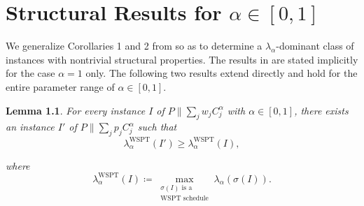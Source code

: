 \documentclass[%
english, titlepage=false %
]{./tum-templates/book/tumbook}
\newtheorem{lemma}{Lemma}
\newcommand{\Problem}{P\!\parallel\!\sum_j p_j C^{\alpha}_j}
\begin{document}
\chapter{Structural Results for
\texorpdfstring{$\alpha \in [0,1]$}{alpha in [0,1]}}\label{chap:alpha_all}

We generalize Corollaries 1 and 2 from \cite{Schwiegelshohn:2011} so as to determine a $\lambda_{\alpha}$-dominant class of instances
with nontrivial structural properties. The results in \cite{Schwiegelshohn:2011} are stated implicitly for 
the case $\alpha=1$ only. The following two results extend directly and hold 
for the entire parameter range of $\alpha \in [0,1]$.

\begin{lemma}\label{lem: lemm1}
For every instance \(I\) of
$P\!\parallel\!\sum_j w_j C^{\alpha}_j$ with
\(\alpha \in [0,1]\), there exists an instance \(I'\) of
$\Problem$ such that
\[
    \lambda^{\mathrm{WSPT}}_{\alpha}(I') \geq \lambda^{\mathrm{WSPT}}_{\alpha}(I),
\]

where \[
\lambda^{\mathrm{WSPT}}_{\alpha}(I)
\coloneqq
\max_{\substack{\sigma(I)\text{ is a}\\ \mathrm{WSPT}\text{ schedule}}}
\lambda_{\alpha}(\sigma(I)).
\]
\end{lemma}
\end{document}
